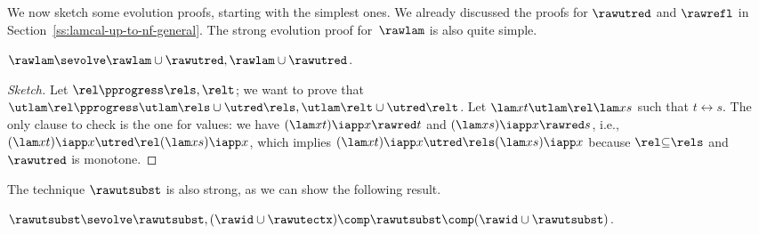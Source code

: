 \documentclass{lmcs}
\theoremstyle{defC}
\begin{document}
We now sketch some evolution proofs, starting with the simplest ones. We already
discussed the proofs for $\rawutred$ and $\rawrefl$ in
Section~\ref{ss:lamcal-up-to-nf-general}. The strong evolution proof
for~$\rawlam$ is also quite simple.

\begin{lem}
  $\rawlam \sevolve \rawlam \cup \rawutred, \rawlam \cup \rawutred$.
\end{lem}

\begin{proof}[Sketch]
Let $\rel \pprogress \rels, \relt$; we want to prove that
$\utlam\rel \pprogress \utlam\rels \cup \utred\rels, \utlam\relt \cup
\utred\relt$.  Let $\lam x t \utlam\rel \lam x s$ such that $t \rel s$. The only
clause to check is the one for values: we have $(\lam x t) \iapp x \rawred t$
and $(\lam x s) \iapp x \rawred s$, i.e., $(\lam x t) \iapp x \utred\rel (\lam x
s) \iapp x$, which implies $(\lam x t) \iapp x \utred\rels (\lam x s) \iapp x$
because $\rel \mathord{\subseteq} \rels$ and $\rawutred$ is monotone.
\end{proof}

The technique $\rawutsubst$ is also strong, as we can show the following result.

\begin{lem}%
  \label{lem:subst}
  $\rawutsubst \sevolve \rawutsubst, (\rawid \cup \rawutectx) \comp \rawutsubst
  \comp (\rawid \cup \rawutsubst)$.
\end{lem}
\end{document}
